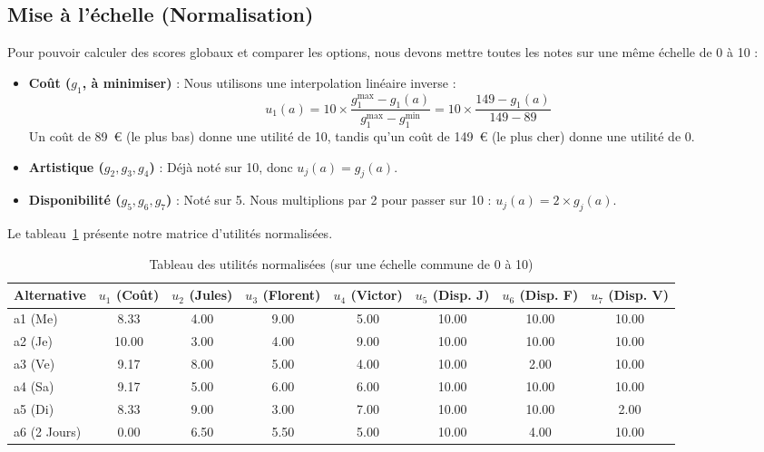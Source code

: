 \documentclass[11pt,a4paper]{article}
\begin{document}
\subsection{Mise à l'échelle (Normalisation)}
Pour pouvoir calculer des scores globaux et comparer les options, nous devons mettre toutes les notes sur une même échelle de 0 à 10 :
\begin{itemize}
    \item \textbf{Coût ($g_1$, à minimiser)} : Nous utilisons une interpolation linéaire inverse :
    $$u_1(a) = 10 \times \frac{g_1^{\max} - g_1(a)}{g_1^{\max} - g_1^{\min}} = 10 \times \frac{149 - g_1(a)}{149 - 89}$$
    Un coût de 89~€ (le plus bas) donne une utilité de 10, tandis qu'un coût de 149~€ (le plus cher) donne une utilité de 0.
    \item \textbf{Artistique ($g_2, g_3, g_4$)} : Déjà noté sur 10, donc $u_j(a) = g_j(a)$.
    \item \textbf{Disponibilité ($g_5, g_6, g_7$)} : Noté sur 5. Nous multiplions par 2 pour passer sur 10 : $u_j(a) = 2 \times g_j(a)$.
\end{itemize}

Le tableau~\ref{tab:perf_normalized} présente notre matrice d'utilités normalisées.

\begin{table}[H]
  \centering
  \caption{Tableau des utilités normalisées (sur une échelle commune de 0 à 10)}
  \label{tab:perf_normalized}
  \begin{tabular}{lccccccc}
    \toprule
    Alternative & $u_1$ (Coût) & $u_2$ (Jules) & $u_3$ (Florent) & $u_4$ (Victor) & $u_5$ (Disp. J) & $u_6$ (Disp. F) & $u_7$ (Disp. V) \\
    \midrule
    a1 (Me) & 8.33 & 4.00 & 9.00 & 5.00 & 10.00 & 10.00 & 10.00 \\
    a2 (Je) & 10.00 & 3.00 & 4.00 & 9.00 & 10.00 & 10.00 & 10.00 \\
    a3 (Ve) & 9.17 & 8.00 & 5.00 & 4.00 & 10.00 & 2.00 & 10.00 \\
    a4 (Sa) & 9.17 & 5.00 & 6.00 & 6.00 & 10.00 & 10.00 & 10.00 \\
    a5 (Di) & 8.33 & 9.00 & 3.00 & 7.00 & 10.00 & 10.00 & 2.00 \\
    a6 (2 Jours) & 0.00 & 6.50 & 5.50 & 5.00 & 10.00 & 4.00 & 10.00 \\
    \bottomrule
  \end{tabular}
\end{table}
\end{document}
